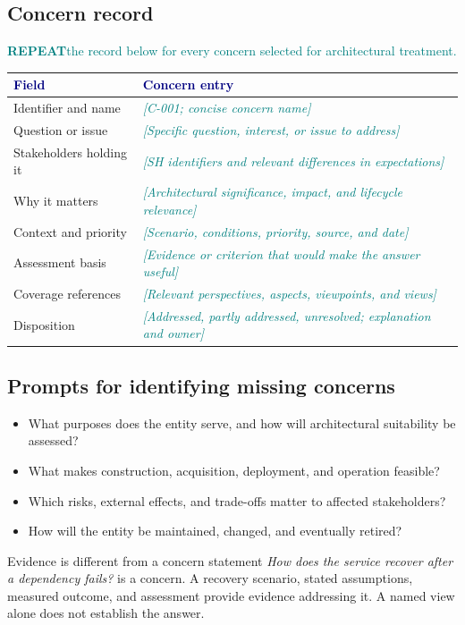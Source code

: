 \documentclass[11pt,letterpaper]{article}
\newcommand{\FillIn}[1]{\textcolor{Teal}{\sffamily\itshape[#1]}}
\newcommand{\TableHead}[1]{\textcolor{Navy}{\sffamily\bfseries#1}}
\newcommand{\Repeat}[1]{\textcolor{Teal}{\sffamily\small\textbf{REPEAT}\enspace #1}\par}
\begin{document}
\subsection{Concern record}
\Repeat{the record below for every concern selected for architectural treatment.}
{\small
\begin{tabularx}{\linewidth}{@{}L{1.49in}Y@{}}
\toprule
\TableHead{Field} & \TableHead{Concern entry}\\
\midrule
Identifier and name & \FillIn{C-001; concise concern name}\\
Question or issue & \FillIn{Specific question, interest, or issue to address}\\
Stakeholders holding it & \FillIn{SH identifiers and relevant differences in expectations}\\
Why it matters & \FillIn{Architectural significance, impact, and lifecycle relevance}\\
Context and priority & \FillIn{Scenario, conditions, priority, source, and date}\\
Assessment basis & \FillIn{Evidence or criterion that would make the answer useful}\\
Coverage references & \FillIn{Relevant perspectives, aspects, viewpoints, and views}\\
Disposition & \FillIn{Addressed, partly addressed, unresolved; explanation and owner}\\
\bottomrule
\end{tabularx}}

\subsection{Prompts for identifying missing concerns}
\begin{itemize}
\item What purposes does the entity serve, and how will architectural suitability
be assessed?
\item What makes construction, acquisition, deployment, and operation feasible?
\item Which risks, external effects, and trade-offs matter to affected stakeholders?
\item How will the entity be maintained, changed, and eventually retired?
\end{itemize}

\begin{TemplateNote}{Evidence is different from a concern statement}
\small
\emph{How does the service recover after a dependency fails?} is a concern.
A recovery scenario, stated assumptions, measured outcome, and assessment
provide evidence addressing it. A named view alone does not establish the answer.
\end{TemplateNote}
\end{document}
